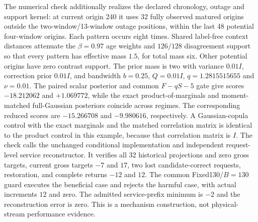 \documentclass[10pt]{article}
\begin{document}
The numerical check additionally realizes the declared chronology, outage
and support kernel: at current origin 240 it uses 32 fully observed matured
origins outside the two-window/13-window outage positions, within the last
48 potential four-window origins.  Each pattern occurs eight times.  Shared
label-free context distances attenuate the $\beta=0.97$ age weights and
$126/128$ disagreement support so that every pattern has effective mass
$1.5$, for total mass six.  Other potential origins have zero contrast support.
The prior mass is two with variance $0.01I$, correction prior $0.01I$,
and bandwidth $b=0.25$,
$Q=0.01I$, $q=1.2815515655$ and $\nu=0.01$.  The paired scalar posterior
and common $F-qS-5$ gate give scores $-18.212062$ and $+1.069772$,
while the exact product-of-marginals
and moment-matched full-Gaussian posteriors coincide across regimes.
The corresponding reduced scores are $-15.266708$ and $-9.980616$,
respectively.  A Gaussian-copula control with the exact marginals and
the matched correlation matrix is identical to the product control in
this example, because that correlation matrix is $I$.
The check calls the unchanged conditional implementation and independent
request-level service reconstructor.  It verifies all 32 historical projections
and zero gross targets, current gross targets $-7$ and $17$, two lost
candidate-correct requests, restoration, and complete returns $-12$ and $12$.
The common Fixed130/$B=130$ guard executes the beneficial case and rejects
the harmful case, with actual increments $12$ and zero.  The admitted
service-prefix minimum is $-2$ and the reconstruction error is zero.
This is a mechanism construction, not physical-stream performance evidence.
\end{document}
